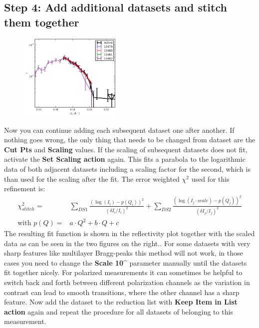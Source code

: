   \subsection{Step 4: Add additional datasets and stitch them together}
    \begin{figure}
    \centering
     \includegraphics[width=138pt]{screenshots/stitching1.png} 
    \end{figure}
    Now you can continue adding each subsequent dataset one after another.
    If nothing goes wrong, the only thing that needs to be changed from dataset are the \textbf{Cut Pts} and \textbf{Scaling} values.
    If the scaling of subsequent datasets does not fit, activate the \textbf{Set Scaling action}  again. 
    This fits a parabola to the logarithmic data of both adjacent datasets including a scaling factor for the second, which is than used for the scaling after the fit.
    The error weighted $\chi^2$ used for this refinement is:
    \begin{eqnarray*}
      \chi_{stitch}^2 =& \underset{DS1}{\sum} \frac{(\log(I_i)-p(Q_i))^2}{(\delta{}I_i/I_i)^2} + \underset{DS2}{\sum} \frac{(\log(I_j\cdot scale)-p(Q_j))^2}{(\delta{}I_j/I_j)^2} \\
      \text{with } p(Q) =& a\cdot Q^2 + b\cdot Q +c
    \end{eqnarray*}
    The resulting fit function is shown in the reflectivity plot together with the scaled data as can be seen in the two figures on the right..
    For some datasets with very sharp features like multilayer Bragg-peaks this method will not work, in those cases you need to change the \textbf{Scale 10\^} parameter manually until the datasets fit together nicely.
    For polarized measurements it can sometimes be helpful to switch back and forth between different polarization channels as the variation in contrast can lead to smooth transitions, where the other channel has a sharp feature.
    Now add the dataset to the reduction list with \textbf{Keep Item in List action}  again and repeat the procedure for all datasets of belonging to this measurement.


